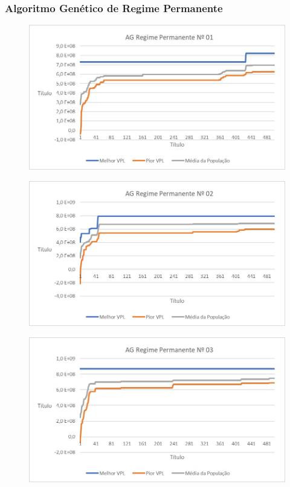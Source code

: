 \documentclass[12pt,a4paper]{report}
\begin{document}
\subsubsection{Algoritmo Genético de Regime Permanente}

\begin{figure}[H]
\centering

\includegraphics[scale=1]{ApB/AGRP/1}

\end{figure}

\begin{figure}[H]
\centering

\includegraphics[scale=1]{ApB/AGRP/2}

\end{figure}

\begin{figure}[H]
\centering

\includegraphics[scale=1]{ApB/AGRP/3}

\end{figure}
\end{document}
